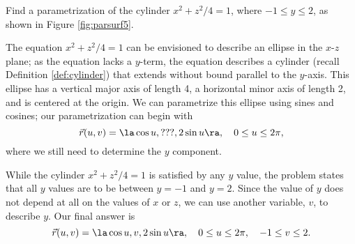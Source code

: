 {Find a parametrization of the cylinder $x^2 + z^2/4=1$, where $-1\leq y\leq 2$, as shown in Figure \ref{fig:parsurf5}. 
}
{The equation $x^2+z^2/4=1$ can be envisioned to describe an ellipse in the $x$-$z$ plane; as the equation lacks a $y$-term, the equation describes a cylinder (recall Definition \ref{def:cylinder}) that extends without bound parallel to the $y$-axis. This ellipse has a vertical major axis of length 4, a horizontal minor axis of length 2, and is centered at the origin. We can parametrize this ellipse using sines and cosines; our parametrization can begin with
$$\vec r(u,v) = \la \cos u, \text{???}, 2\sin u\ra,\quad 0\leq u\leq 2\pi,$$
where we still need to determine the $y$ component.


While the cylinder $x^2+z^2/4=1$ is satisfied by any $y$ value, the problem states that all $y$ values are to be between $y=-1$ and $y=2$. Since the value of $y$ does not depend at all on the values of $x$ or $z$, we can use another variable, $v$, to describe $y$. Our final answer is
$$\vec r(u,v) = \la \cos u, v, 2\sin u\ra, \quad 0\leq u\leq 2\pi,\quad -1\leq v\leq 2.$$
\baselineskip
}\\


